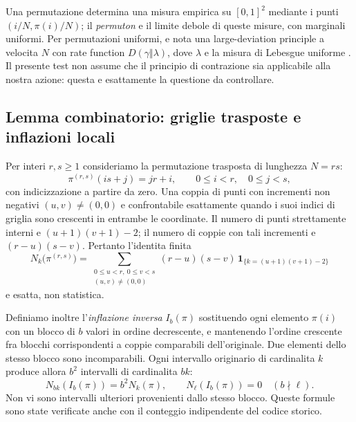 \documentclass[11pt,a4paper]{article}
\begin{document}
Una permutazione determina una misura empirica su $[0,1]^2$ mediante i punti $(i/N,\pi(i)/N)$; il \emph{permuton} e il limite debole di queste misure, con marginali uniformi. Per permutazioni uniformi, e nota una large-deviation principle a velocita $N$ con rate function $D(\gamma\Vert\lambda)$, dove $\lambda$ e la misura di Lebesgue uniforme \cite{BorgaEtAl2024,KenyonEtAl2020}. Il presente test non assume che il principio di contrazione sia applicabile alla nostra azione: questa e esattamente la questione da controllare.

\subsection{Lemma combinatorio: griglie trasposte e inflazioni locali}

Per interi $r,s\ge1$ consideriamo la permutazione trasposta di lunghezza $N=rs$:
\begin{equation}
 \pi^{(r,s)}(is+j)=jr+i,\qquad 0\le i<r,\quad 0\le j<s,\label{eq:r12y_grid}
\end{equation}
con indicizzazione a partire da zero. Una coppia di punti con incrementi non negativi $(u,v)\ne(0,0)$ e confrontabile esattamente quando i suoi indici di griglia sono crescenti in entrambe le coordinate. Il numero di punti strettamente interni e $(u+1)(v+1)-2$; il numero di coppie con tali incrementi e $(r-u)(s-v)$. Pertanto l'identita finita
\begin{equation}
 N_k\bigl(\pi^{(r,s)}\bigr)=\!\!\sum_{\substack{0\le u<r,\ 0\le v<s\\(u,v)\ne(0,0)}}
 (r-u)(s-v)\,\mathbf1_{\{k=(u+1)(v+1)-2\}}\label{eq:r12y_hist}
\end{equation}
e esatta, non statistica.

Definiamo inoltre l'\emph{inflazione inversa} $I_b(\pi)$ sostituendo ogni elemento $\pi(i)$ con un blocco di $b$ valori in ordine decrescente, e mantenendo l'ordine crescente fra blocchi corrispondenti a coppie comparabili dell'originale. Due elementi dello stesso blocco sono incomparabili. Ogni intervallo originario di cardinalita $k$ produce allora $b^2$ intervalli di cardinalita $bk$:
\begin{equation}
 N_{bk}(I_b(\pi))=b^2N_k(\pi),\qquad
 N_{\ell}(I_b(\pi))=0\quad(b\nmid\ell).\label{eq:r12y_inflate}
\end{equation}
Non vi sono intervalli ulteriori provenienti dallo stesso blocco. Queste formule sono state verificate anche con il conteggio indipendente del codice storico.
\end{document}
